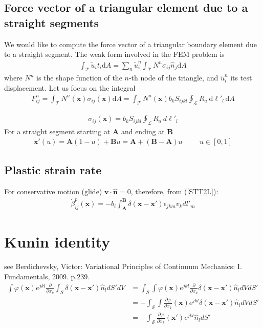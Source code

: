 \documentclass[10pt]{report}
\begin{document}
{\subsection{Force vector of a triangular element due to a straight segments}
We would like to compute the force vector of a triangular boundary element due to a straight segment. The weak form involved in the FEM problem is
\begin{align}
\int_\mathcal{T}\tilde u_i t_i \text{d}A=\sum_n \tilde u^n_i\int_\mathcal{T}N^n \sigma_{ij}\hat{n}_j \text{d}A
\end{align}
where $N^n$ is the shape function of the $n$-th node of the triangle, and $\tilde u^n_i$ its test displacement. Let us focus on the integral
\begin{align}
F^n_{ij}=\int_\mathcal{T}N^n(\bm x) \sigma_{ij}(\bm x) \text{d}A
=\int_\mathcal{T}N^n(\bm x) b_kS_{ijkl}\oint_\mathcal{L}R_a\ \text{d}\ell'_l\, \text{d}A
\end{align}


\begin{align}
\sigma_{ij}(\bm x)=b_kS_{ijkl}\oint_\mathcal{L}R_a\ d\ell'_l
\end{align}
For a straight segment starting at $\bm A$ and ending at $\bm B$
\begin{align}
\bm x'(u)=\bm A(1-u)+\bm Bu=\bm A+(\bm B-\bm A)u\hspace{1cm} u\in[0,1]
\end{align}






\subsection{Plastic strain rate}

For conservative motion (glide) $\bm v\cdot\hat{\bm n}=0$, therefore, from (\ref{STT2L}):
\begin{align}
\dot\beta^p_{ij}(\bm x)=-b_i\int_{\bm A}^{\bm B}\delta(\bm x-\bm x')\epsilon_{jkm}v_kdl'_m
\end{align}


\appendix

\section{Kunin identity}
see Berdichevsky, Victor: Variational Principles of Continuum Mechanics: I. Fundamentals, 2009. p.239.
\begin{align}
\int\varphi(\bm x)e^{jkl}\frac{\partial}{\partial x_k}\int_\mathcal{S} \delta(\bm x-\bm x')\hat{n}_ldS'dV&=\int_\mathcal{S} \int\varphi(\bm x)e^{jkl}\frac{\partial}{\partial x_k}\delta(\bm x-\bm x')\hat{n}_ldVdS'\nonumber\\
&=-\int_\mathcal{S} \int\frac{\partial\varphi}{\partial x_k}(\bm x)e^{jkl}\delta(\bm x-\bm x')\hat{n}_ldVdS'\nonumber\\
&=-\int_\mathcal{S} \frac{\partial\varphi}{\partial x_k}(\bm x')e^{jkl}\hat{n}_ldS'\nonumber\\
\end{align}


}
\end{document}

